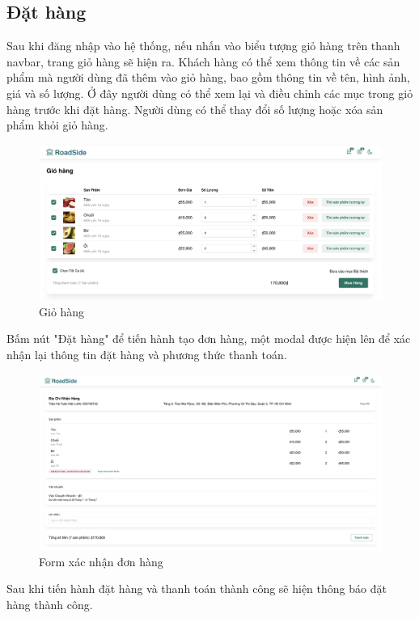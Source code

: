\subsection{Đặt hàng}
Sau khi đăng nhập vào hệ thống, nếu nhấn vào biểu tượng giỏ hàng trên thanh navbar, trang giỏ hàng sẽ hiện ra. Khách hàng có thể xem thông tin về các sản phẩm mà người dùng đã thêm vào giỏ hàng, bao gồm thông tin về tên, hình ảnh, giá và số lượng. Ở đây người dùng có thể xem lại và điều chỉnh các mục trong giỏ hàng trước khi đặt hàng. Người dùng có thể thay đổi số lượng hoặc xóa sản phẩm khỏi giỏ hàng.
    \begin{figure}[H]
        \centering
        \includegraphics[width=1\linewidth] {Images/UI/cart.png}
        \vspace{1em}
        \caption{Giỏ hàng}
    \end{figure}

Bấm nút "Đặt hàng" để tiến hành tạo đơn hàng, một modal được hiện lên để xác nhận lại thông tin đặt hàng và phương thức thanh toán.

    \begin{figure}[H]
        \begin{center}
        \includegraphics[scale=0.3] {Images/UI/orderform.png}
        \end{center}
        \caption{Form xác nhận đơn hàng}
    \end{figure}
Sau khi tiến hành đặt hàng và thanh toán thành công sẽ hiện thông báo đặt hàng thành công.
